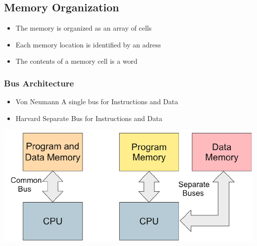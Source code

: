 \subsection{Memory Organization }
\begin{minipage}{9cm}
		\begin{itemize}
			\item The memory is organized as an array of cells
			\item Each memory location is identified by an adress
			\item The contents of a memory cell is a word
		\end{itemize}
    
\subsubsection{Bus Architecture}
    \begin{itemize}
        \item Von Neumann
        \subitem A single bus for Instructions and Data
        \item Harvard
        \subitem Separate Bus for Instructions and Data
    \end{itemize}
\end{minipage}
\begin{minipage}{8cm}
    \includegraphics[width=\linewidth]{images/bus}
\end{minipage}

